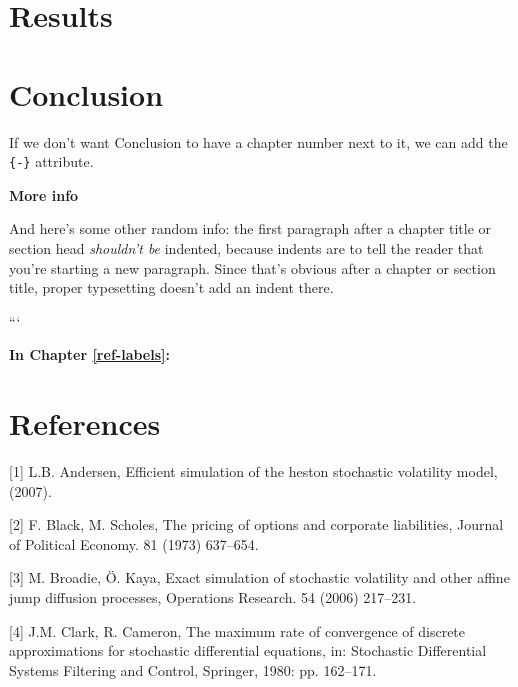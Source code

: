 \documentclass[12pt,twoside]{reedthesis}
\theoremstyle{definition}
\theoremstyle{definition}
\theoremstyle{remark}
\begin{document}
  \chapter{Results}\label{results}
  
  \chapter{Conclusion}\label{conclusion}
  
  If we don't want Conclusion to have a chapter number next to it, we can
  add the \texttt{\{-\}} attribute.
  
  \textbf{More info}
  
  And here's some other random info: the first paragraph after a chapter
  title or section head \emph{shouldn't be} indented, because indents are
  to tell the reader that you're starting a new paragraph. Since that's
  obvious after a chapter or section title, proper typesetting doesn't add
  an indent there.
  
  \appendix
  
  ```
  
  \textbf{In Chapter \ref{ref-labels}:}
  
  \backmatter
  
  \chapter*{References}\label{references}
  
  \noindent
  
  \setlength{\parindent}{-0.20in} \setlength{\leftskip}{0.20in}
  \setlength{\parskip}{8pt}
  
  \hypertarget{refs}{}
  \hypertarget{ref-andersen}{}
  {[}1{]} L.B. Andersen, Efficient simulation of the heston stochastic
  volatility model, (2007).
  
  \hypertarget{ref-black1973pricing}{}
  {[}2{]} F. Black, M. Scholes, The pricing of options and corporate
  liabilities, Journal of Political Economy. 81 (1973) 637--654.
  
  \hypertarget{ref-broadie2006exact}{}
  {[}3{]} M. Broadie, Ö. Kaya, Exact simulation of stochastic volatility
  and other affine jump diffusion processes, Operations Research. 54
  (2006) 217--231.
  
  \hypertarget{ref-clark1980maximum}{}
  {[}4{]} J.M. Clark, R. Cameron, The maximum rate of convergence of
  discrete approximations for stochastic differential equations, in:
  Stochastic Differential Systems Filtering and Control, Springer, 1980:
  pp. 162--171.
  
\end{document}
